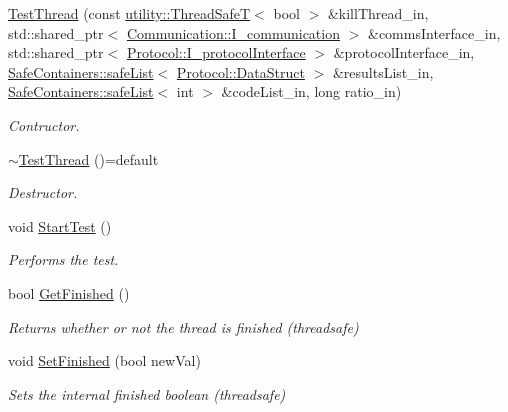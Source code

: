 \begin{DoxyCompactItemize}
\item 
\mbox{\hyperlink{classTestRunner_1_1TestThread_ac026c748166fa2f487419c957582f6a2}{Test\+Thread}} (const \mbox{\hyperlink{classutility_1_1ThreadSafeT}{utility\+::\+Thread\+SafeT}}$<$ bool $>$ \&kill\+Thread\+\_\+in, std\+::shared\+\_\+ptr$<$ \mbox{\hyperlink{classCommunication_1_1I__communication}{Communication\+::\+I\+\_\+communication}} $>$ \&comms\+Interface\+\_\+in, std\+::shared\+\_\+ptr$<$ \mbox{\hyperlink{classProtocol_1_1I__protocolInterface}{Protocol\+::\+I\+\_\+protocol\+Interface}} $>$ \&protocol\+Interface\+\_\+in, \mbox{\hyperlink{classSafeContainers_1_1safeList}{Safe\+Containers\+::safe\+List}}$<$ \mbox{\hyperlink{structProtocol_1_1DataStruct}{Protocol\+::\+Data\+Struct}} $>$ \&results\+List\+\_\+in, \mbox{\hyperlink{classSafeContainers_1_1safeList}{Safe\+Containers\+::safe\+List}}$<$ int $>$ \&code\+List\+\_\+in, long ratio\+\_\+in)
\begin{DoxyCompactList}\small\item\em Contructor. \end{DoxyCompactList}\item 
\mbox{\label{classTestRunner_1_1TestThread_ad9589c0f5ebd800c95b7b1dc3a5edf82}} 
\mbox{\hyperlink{classTestRunner_1_1TestThread_ad9589c0f5ebd800c95b7b1dc3a5edf82}{$\sim$\+Test\+Thread}} ()=default
\begin{DoxyCompactList}\small\item\em Destructor. \end{DoxyCompactList}\item 
void \mbox{\hyperlink{classTestRunner_1_1TestThread_a76bafaf7bb25c238bfb86081e1393a2d}{Start\+Test}} ()
\begin{DoxyCompactList}\small\item\em Performs the test. \end{DoxyCompactList}\item 
bool \mbox{\hyperlink{classTestRunner_1_1TestThread_a33c15bccf3a0aaaab9014afd0abcc4f6}{Get\+Finished}} ()
\begin{DoxyCompactList}\small\item\em Returns whether or not the thread is finished (threadsafe) \end{DoxyCompactList}\item 
void \mbox{\hyperlink{classTestRunner_1_1TestThread_ad2ffc72393710905ba51959641c68eb3}{Set\+Finished}} (bool new\+Val)
\begin{DoxyCompactList}\small\item\em Sets the internal finished boolean (threadsafe) \end{DoxyCompactList}\end{DoxyCompactItemize}


